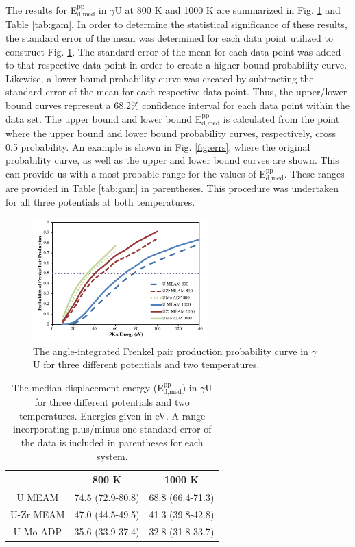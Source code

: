 \documentclass[review]{elsarticle}
\begin{document}
The results for E$^{\textrm{pp}}_{\textrm{d,med}}$ in $\gamma$U at 800 K and 1000 K are summarized in Fig. \ref{fig:800_1000} and Table \ref{tab:gam}. In order to determine the statistical significance of these results, the standard error of the mean was determined for each data point utilized to construct Fig. \ref{fig:800_1000}. The standard error of the mean for each data point was added to that respective data point in order to create a higher bound probability curve. Likewise, a lower bound probability curve was created by subtracting the standard error of the mean for each respective data point. Thus, the upper/lower bound curves represent a 68.2\% confidence interval for each data point within the data set. The upper bound and lower bound E$^{\textrm{pp}}_{\textrm{d,med}}$ is calculated from the point where the upper bound and lower bound probability curves, respectively, cross 0.5 probability. An example is shown in Fig. \ref{fig:errs}, where the original probability curve, as well as the upper and lower bound curves are shown. This can provide us with a most probable range for the values of E$^{\textrm{pp}}_{\textrm{d,med}}$. These ranges are provided in Table \ref{tab:gam} in parentheses. This procedure was undertaken for all three potentials at both temperatures.

\begin{figure}[h]
 \centering
 \includegraphics[width=0.6\textwidth]{800_1000.png} 
 \caption{The angle-integrated Frenkel pair production probability curve in $\gamma$U for three different potentials and two temperatures.}
 \label{fig:800_1000}
\end{figure}

\begin{table}[h]
\caption{The median displacement energy (E$^{\textrm{pp}}_{\textrm{d,med}}$) in $\gamma$U for three different potentials and two temperatures. Energies given in eV. A range incorporating plus/minus one standard error of the data is included in parentheses for each system.} \label{tab:gam}
\begin{center}
\begin{tabular}{|c|c|c|}
	\hline
	& 800 K & 1000 K \\
	 \hline
	 U MEAM & 74.5 (72.9-80.8) & 68.8 (66.4-71.3) \\
	 U-Zr MEAM & 47.0 (44.5-49.5) & 41.3 (39.8-42.8) \\
	 U-Mo ADP & 35.6 (33.9-37.4) & 32.8 (31.8-33.7) \\
	 \hline
\end{tabular}
\end{center}
\label{default}
\end{table}
\end{document}

